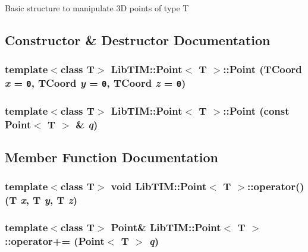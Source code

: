 Basic structure to manipulate 3D points of type T



\subsection{Constructor \& Destructor Documentation}
\subsubsection{\setlength{\rightskip}{0pt plus 5cm}template$<$class T$>$ {\bf Lib\-TIM::Point}$<$ T $>$::{\bf Point} ({\bf TCoord} {\em x} = {\tt 0}, {\bf TCoord} {\em y} = {\tt 0}, {\bf TCoord} {\em z} = {\tt 0})\hspace{0.3cm}{\tt  [inline]}}\label{classLibTIM_1_1Point_a0}


\subsubsection{\setlength{\rightskip}{0pt plus 5cm}template$<$class T$>$ {\bf Lib\-TIM::Point}$<$ T $>$::{\bf Point} (const {\bf Point}$<$ T $>$ \& {\em q})\hspace{0.3cm}{\tt  [inline]}}\label{classLibTIM_1_1Point_a5}




\subsection{Member Function Documentation}
\subsubsection{\setlength{\rightskip}{0pt plus 5cm}template$<$class T$>$ void {\bf Lib\-TIM::Point}$<$ T $>$::operator() (T {\em x}, T {\em y}, T {\em z})\hspace{0.3cm}{\tt  [inline]}}\label{classLibTIM_1_1Point_a6}


\subsubsection{\setlength{\rightskip}{0pt plus 5cm}template$<$class T$>$ {\bf Point}\& {\bf Lib\-TIM::Point}$<$ T $>$::operator+= ({\bf Point}$<$ T $>$ {\em q})\hspace{0.3cm}{\tt  [inline]}}\label{classLibTIM_1_1Point_a1}


